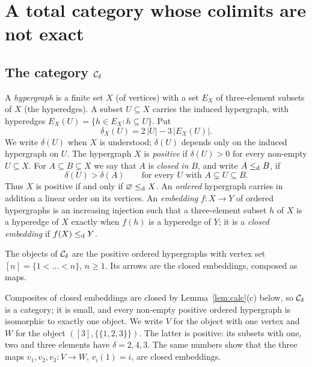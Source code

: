 \section{A total category whose colimits are not exact}\label{sec:cdelta}

\subsection{The category $\mathcal{C}_{\delta}$}

A \emph{hypergraph} is a finite set $X$ (of vertices) with a set $E_X$ of
three-element subsets of $X$ (the hyperedges). A subset $U\subseteq X$
carries the induced hypergraph, with hyperedges
$E_X(U)=\{h\in E_X: h\subseteq U\}$. Put
\[
 \delta_X(U)=2\,|U|-3\,|E_X(U)| .
\]
We write $\delta(U)$ when $X$ is understood; $\delta(U)$ depends only on the
induced hypergraph on $U$. The hypergraph $X$ is \emph{positive} if
$\delta(U)>0$ for every non-empty $U\subseteq X$. For $A\subseteq B\subseteq X$
we say that $A$ is \emph{closed in} $B$, and write $A\leq_{\mathrm{d}} B$, if
\[
 \delta(U)>\delta(A)\qquad\text{for every } U \text{ with } A\subsetneq U\subseteq B .
\]
Thus $X$ is positive if and only if $\varnothing\leq_{\mathrm{d}} X$. An \emph{ordered}
hypergraph carries in addition a linear order on its vertices. An
\emph{embedding} $f\colon X\to Y$ of ordered hypergraphs is an increasing
injection such that a three-element subset $h$ of $X$ is a hyperedge of $X$
exactly when $f(h)$ is a hyperedge of $Y$; it is a \emph{closed embedding} if
$f(X)\leq_{\mathrm{d}} Y$.

\begin{definition}\label{def:cdelta}
The objects of $\mathcal{C}_{\delta}$ are the positive ordered hypergraphs with vertex set
$[n]=\{1<\dots<n\}$, $n\ge 1$. Its arrows are the closed embeddings, composed as
maps.
\end{definition}

Composites of closed embeddings are closed by Lemma~\ref{lem:calc}(c) below, so
$\mathcal{C}_{\delta}$ is a category; it is small, and every non-empty positive ordered
hypergraph is isomorphic to exactly one object. We write $V$ for the object
with one vertex and $W$ for the object $([3],\{\{1,2,3\}\})$. The latter is
positive: its subsets with one, two and three elements have
$\delta=2,4,3$. The same numbers show that the three maps
$v_1,v_2,v_3\colon V\to W$, $v_i(1)=i$, are closed embeddings.

